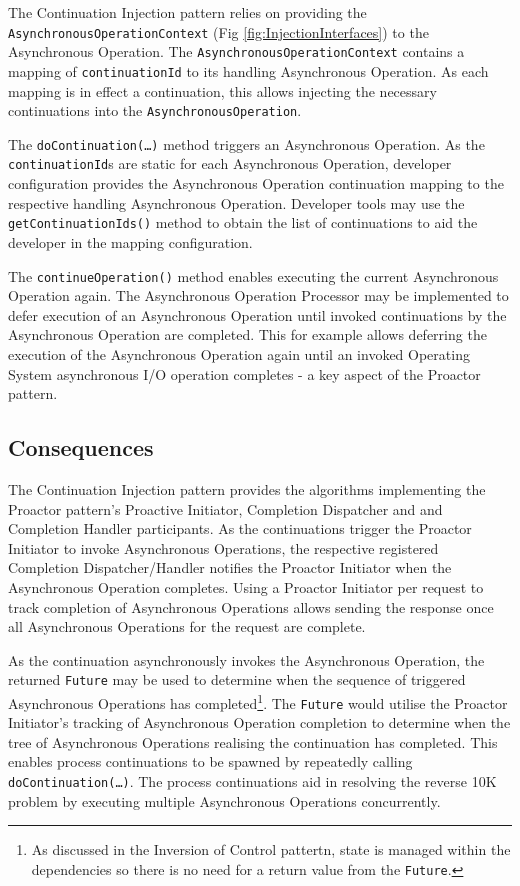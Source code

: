 \documentclass[prodmode]{style/acmlarge}
\begin{document}
The Continuation Injection pattern relies on providing the
\texttt{AsynchronousOperationContext} (Fig \ref{fig:InjectionInterfaces}) to the
Asynchronous Operation.  The \texttt{AsynchronousOperationContext} contains a
mapping of \texttt{continuationId} to its handling Asynchronous Operation.  As
each mapping is in effect a continuation, this allows injecting the necessary
continuations into the \texttt{AsynchronousOperation}.

The \texttt{doContinuation(\ldots)} method triggers an Asynchronous Operation.
As the \texttt{continuationId}s are static for each Asynchronous Operation,
developer configuration provides the Asynchronous Operation continuation mapping
to the respective handling Asynchronous Operation.  Developer tools may use the
\texttt{getContinuationIds()} method to obtain the list of continuations to aid
the developer in the mapping configuration.

The \texttt{continueOperation()} method enables executing the current
Asynchronous Operation again.  The Asynchronous Operation Processor may be
implemented to defer execution of an Asynchronous Operation until invoked
continuations by the Asynchronous Operation are completed.  This for example
allows deferring the execution of the Asynchronous Operation again until an
invoked Operating System asynchronous I/O operation completes - a key aspect of
the Proactor pattern.


\subsection{Consequences}

The Continuation Injection pattern provides the algorithms implementing the
Proactor pattern's Proactive Initiator, Completion Dispatcher and and Completion
Handler participants.  As the continuations trigger the Proactor Initiator to
invoke Asynchronous Operations, the respective registered Completion
Dispatcher/Handler notifies the Proactor Initiator when the Asynchronous
Operation completes.  Using a Proactor Initiator per request to track completion
of Asynchronous Operations allows sending the response once all Asynchronous
Operations for the request are complete.

As the continuation asynchronously invokes the Asynchronous Operation, the
returned \texttt{Future} may be used to determine when the sequence of triggered
Asynchronous Operations has completed\footnote{As discussed in the Inversion of
Control pattertn, state is managed within the dependencies so there is no need
for a return value from the \texttt{Future}.}.  The \texttt{Future} would
utilise the Proactor Initiator's tracking of Asynchronous Operation completion
to determine when the tree of Asynchronous Operations realising the continuation
has completed.  This enables process continuations \cite{process-continuation}
to be spawned by repeatedly calling \texttt{doContinuation(\ldots)}.  The
process continuations aid in resolving the reverse 10K problem
\cite{reverse-ten-k-problem} by executing multiple Asynchronous Operations
concurrently.
\end{document}
